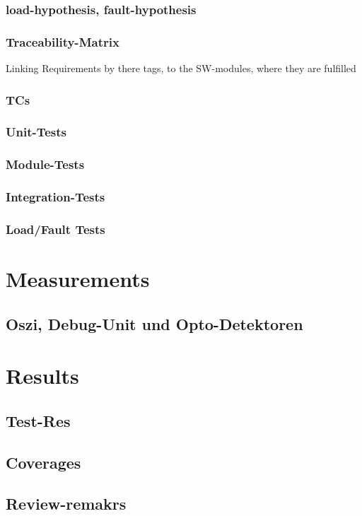 \documentclass[master,english,smartquotes,apa]{hgbthesis}
\begin{document}
			\subsection{load-hypothesis, fault-hypothesis}
			\subsection{Traceability-Matrix}
			Linking Requirements by there tags, to the SW-modules, where they are fulfilled
			\subsection{TCs}
			\subsection{Unit-Tests}
			\subsection{Module-Tests}
			\subsection{Integration-Tests}
			\subsection{Load/Fault Tests}
			
		
	\chapter{Measurements}
		\section{Oszi, Debug-Unit und Opto-Detektoren}

	\chapter{Results}
	\label{cha:Results}
		\section{Test-Res}
		\section{Coverages}
		\section{Review-remakrs}
\end{document}
